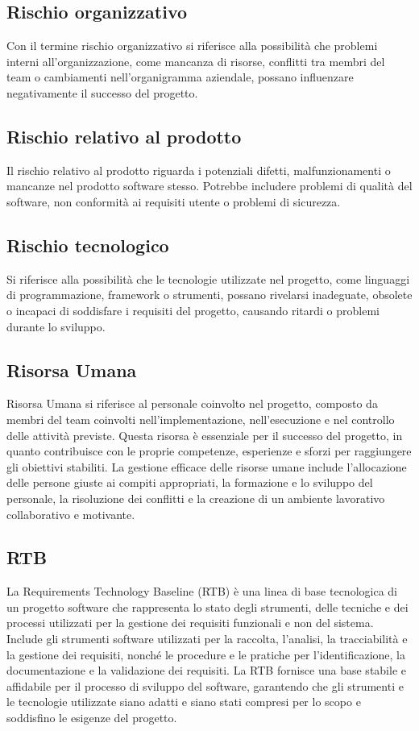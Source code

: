 \subsection{Rischio organizzativo} 
Con il termine rischio organizzativo si riferisce alla possibilità che problemi interni all'organizzazione, come mancanza di risorse, conflitti tra membri del team o cambiamenti nell'organigramma aziendale, possano influenzare negativamente il successo del progetto.
\subsection{Rischio relativo al prodotto} 
Il rischio relativo al prodotto riguarda i potenziali difetti, malfunzionamenti o mancanze nel prodotto software stesso. Potrebbe includere problemi di qualità del software, non conformità ai requisiti utente o problemi di sicurezza.
\subsection{Rischio tecnologico} 
Si riferisce alla possibilità che le tecnologie utilizzate nel progetto, come linguaggi di programmazione, framework o strumenti, possano rivelarsi inadeguate, obsolete o incapaci di soddisfare i requisiti del progetto, causando ritardi o problemi durante lo sviluppo.
\subsection{Risorsa Umana} 
Risorsa Umana si riferisce al personale coinvolto nel progetto, composto da membri del team coinvolti nell'implementazione, nell'esecuzione e nel controllo delle attività previste. Questa risorsa è essenziale per il successo del progetto, in quanto contribuisce con le proprie competenze, esperienze e sforzi per raggiungere gli obiettivi stabiliti. La gestione efficace delle risorse umane include l'allocazione delle persone giuste ai compiti appropriati, la formazione e lo sviluppo del personale, la risoluzione dei conflitti e la creazione di un ambiente lavorativo collaborativo e motivante. 
\subsection{RTB} 
La Requirements Technology Baseline (RTB) è una linea di base tecnologica di un progetto software che rappresenta lo stato degli strumenti, delle tecniche e dei processi utilizzati per la gestione dei requisiti funzionali e non del sistema. Include gli strumenti software utilizzati per la raccolta, l'analisi, la tracciabilità e la gestione dei requisiti, nonché le procedure e le pratiche per l'identificazione, la documentazione e la validazione dei requisiti. La RTB fornisce una base stabile e affidabile per il processo di sviluppo del software, garantendo che gli strumenti e le tecnologie utilizzate siano adatti e siano stati compresi per lo scopo e soddisfino le esigenze del progetto.
